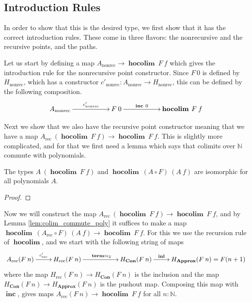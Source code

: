 \documentclass[a4paper,UKenglish]{lipics-v2016}
\newcommand{\rec}[0]{\operatorname{rec}}
\newcommand{\nonrec}[0]{\operatorname{nonrec}}
\newcommand{\term}[0]{\textbf{term}}
\newcommand{\Con}[0]{\textbf{Con}}
\newcommand{\Approx}[0]{\textbf{Approx}}
\newcommand{\hocolim}[0]{\operatorname{\textbf{hocolim}}}
\newcommand{\inl}[0]{\operatorname{\textbf{inl}}}
\newcommand{\inc}[0]{\operatorname{\textbf{inc}}}
\begin{document}
\subsection{Introduction Rules}
In order to show that this is the desired type, we first show that it has the correct introduction rules.
These come in three flavors: the nonrecursive and the recursive points, and the paths.

Let us start by defining a map $A_{\nonrec} \rightarrow \hocolim \> F \> f$ which gives the introduction rule for the nonrecursive point constructor.
Since $F \> 0$ is defined by $H_{\nonrec}$, which has a constructor $c'_{\nonrec} : A_{\nonrec} \rightarrow H_{\nonrec}$, this can be defined by the following composition.
\[
\xymatrix
{
	A_{\nonrec} \ar[rr]^-{c'_{\nonrec}}
		& & F \> 0 \ar[rr]^-{\inc \> 0}
		& & \hocolim \> F \> f
}
\]

Next we show that we also have the recursive point constructor meaning that we have a map $A_{\rec} \> (\hocolim \> F \> f) \rightarrow \hocolim \> F \> f$.
This is slightly more complicated, and for that we first need a lemma which says that colimits over $\mathbb{N}$ commute with polynomials.

\begin{lemma}
\label{lem:colim_commute_poly}
The types $A \> (\hocolim \> F \> f)$ and $\hocolim \> (A \circ F) \> (A \> f)$ are isomorphic for all polynomials $A$.
\end{lemma}

\begin{proof}

\end{proof}

Now we will construct the map $A_{\rec} \> (\hocolim \> F \> f) \rightarrow \hocolim \> F \> f$, and by Lemma \ref{lem:colim_commute_poly} it suffices to make a map $\hocolim \> (A_{\rec} \circ F) \> (A \> f) \rightarrow \hocolim \> F \> f$.
For this we use the recursion rule of $\hocolim$, and we start with the following string of maps
\[
\xymatrix
{
		A_{\rec}(F \> n) \ar[r]^-{c_{\rec}'} 
		& H_{\rec}(F \> n) \ar[rr]^{\term \circ \iota_2} &
		& H_{\Con}(F \> n) \ar[r]^-{\inl}
		& H_{\Approx}(F \> n) = F(n + 1)
}
\]
where the map $H_{\rec}(F \> n) \rightarrow H_{\Con}(F \> n)$ is the inclusion and the map $H_{\Con}(F \> n) \rightarrow H_{\Approx}(F \> n)$ is the pushout map.
Composing this map with $\inc$, gives maps $A_{\rec}(F \> n) \rightarrow \hocolim \> F \> f$ for all $n : \mathbb{N}$.
\end{document}
